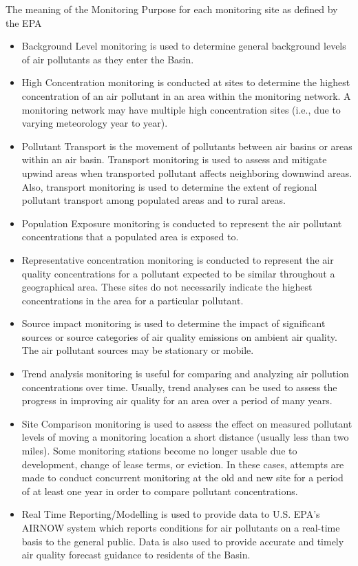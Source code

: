 The meaning of the Monitoring Purpose for each monitoring site as defined by the \ac{EPA}

\begin{itemize}
    \item Background Level monitoring is used to determine general background levels of air pollutants as they enter the Basin.
    \item High Concentration monitoring is conducted at sites to determine the highest concentration of an air pollutant in an area within the monitoring network. A monitoring network may have multiple high concentration sites (i.e., due to varying meteorology year to year).
    \item Pollutant Transport is the movement of pollutants between air basins or areas within an air basin. Transport monitoring is used to assess and mitigate upwind areas when transported pollutant affects neighboring downwind areas. Also, transport monitoring is used to determine the extent of regional pollutant transport among populated areas and to rural areas.
    \item Population Exposure monitoring is conducted to represent the air pollutant concentrations that a populated area is exposed to.
    \item Representative concentration monitoring is conducted to represent the air quality concentrations for a pollutant expected to be similar throughout a geographical area. These sites do not necessarily indicate the highest concentrations in the area for a particular pollutant.
    \item Source impact monitoring is used to determine the impact of significant sources or source categories of air quality emissions on ambient air quality. The air pollutant sources may be stationary or mobile.
    \item Trend analysis monitoring is useful for comparing and analyzing air pollution concentrations over time. Usually, trend analyses can be used to assess the progress in improving air quality for an area over a period of many years.
    \item Site Comparison monitoring is used to assess the effect on measured pollutant levels of moving a monitoring location a short distance (usually less than two miles). Some monitoring stations become no longer usable due to development, change of lease terms, or eviction. In these cases, attempts are made to conduct concurrent monitoring at the old and new site for a period of at least one year in order to compare pollutant concentrations.
    \item Real Time Reporting/Modelling is used to provide data to U.S. EPA’s AIRNOW system which reports conditions for air pollutants on a real-time basis to the general public. Data is also used to provide accurate and timely air quality forecast guidance to residents of the Basin.
\end{itemize}
\cite{AQMNP:2019}